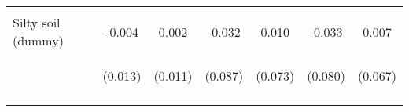 \begin{center}
\begin{tabular}{lcccccc}
\vspace{4pt} & \begin{footnotesize}[0.525]\end{footnotesize} & \begin{footnotesize}[0.485]\end{footnotesize} & \begin{footnotesize}[0.448]\end{footnotesize} & \begin{footnotesize}[0.541]\end{footnotesize} & \begin{footnotesize}[0.449]\end{footnotesize} & \begin{footnotesize}[0.552]\end{footnotesize} \\
Silty soil (dummy) & -0.004 & 0.002 & -0.032 & 0.010 & -0.033 & 0.007 \\
 & \begin{footnotesize}(0.013)\end{footnotesize} & \begin{footnotesize}(0.011)\end{footnotesize} & \begin{footnotesize}(0.087)\end{footnotesize} & \begin{footnotesize}(0.073)\end{footnotesize} & \begin{footnotesize}(0.080)\end{footnotesize} & \begin{footnotesize}(0.067)\end{footnotesize} \\
\vspace{4pt} & \begin{footnotesize}[0.732]\end{footnotesize} & \begin{footnotesize}[0.864]\end{footnotesize} & \begin{footnotesize}[0.708]\end{footnotesize} & \begin{footnotesize}[0.893]\end{footnotesize} & \begin{footnotesize}[0.676]\end{footnotesize} & \begin{footnotesize}[0.922]\end{footnotesize} \\

\end{tabular}
\end{center}
